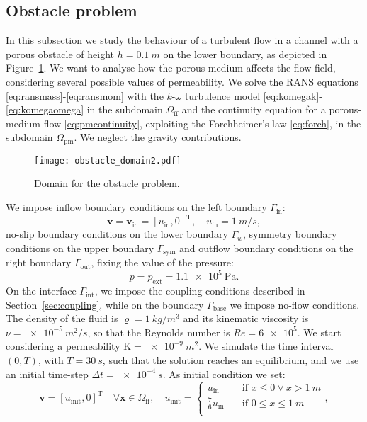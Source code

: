 \subsection{Obstacle problem}
In this subsection we study the behaviour of
a turbulent flow in a channel with a porous obstacle of height $h=\SI{0.1}{m}$ on the lower boundary, as depicted in Figure~\ref{fig:obstacle_domain}. We want to analyse how the porous-medium affects the flow field, considering several possible values of permeability.
We solve the RANS equations \eqref{eq:ransmass}-\eqref{eq:ransmom} with the $k\text{-}\omega$ turbulence model \eqref{eq:komegak}-\eqref{eq:komegaomega} in the subdomain $\Omega_\text{ff}$ and the continuity equation for a porous-medium flow \eqref{eq:pmcontinuity}, exploiting the Forchheimer's law \eqref{eq:forch}, in the subdomain $\Omega_\text{pm}$. We neglect the gravity contributions.
\begin{figure}
	\centering
	\texttt{[image: obstacle\_domain2.pdf]}
	\caption[Domain for the obstacle problem]{Domain for the obstacle problem.}
	\label{fig:obstacle_domain}
\end{figure}
We impose inflow boundary conditions on the left boundary $\Gamma_\text{in}$:
\begin{equation}
\mathbf{v} = \mathbf{v}_\text{in} = [u_\text{in}, 0]^\mathrm{T}, \quad u_\text{in} = \SI{1}{m/s},
\end{equation}
no-slip boundary conditions on the lower boundary $\Gamma_w$, symmetry boundary conditions on the upper boundary $\Gamma_\text{sym}$ and outflow boundary conditions on the right boundary $\Gamma_\text{out}$, fixing the value of the pressure:
\begin{equation}
	p = p_\text{ext} = \SI{1.1e5}{\pascal}.
\end{equation}
On the interface $\Gamma_\text{int}$, we impose the coupling conditions described in Section~\ref{sec:coupling}, while on the boundary $\Gamma_\text{base}$ we impose no-flow conditions.
The density of the fluid is $\varrho = \SI{1}{kg/m^3}$ and its kinematic viscosity is $\nu=\SI{e-5}{m^2/s}$, so that the Reynolds number is $Re=\num{6e5}$. We start considering a permeability $\mathrm{K}=\SI{e-9}{m^2}.$ We simulate the time interval $(0,T) $, with $T=\SI{30}{s}$, such that the solution reaches an equilibrium, and we use an initial time-step $\Delta t = \SI{e-4}{s}$. As initial condition we set:
\begin{equation}
	\mathbf{v} = [u_\text{init}, 0]^\mathrm{T} \quad \forall \mathbf{x} \in \Omega_\text{ff}, \quad u_\text{init} =
	\begin{cases}
	u_\text{in} \quad&\text{if $x\leq 0 \lor x > \SI{1}{m}$}\\
	\frac{7}{6}u_\text{in} \quad&\text{if $0 \leq x \leq \SI{1}{m}$}\\
	\end{cases},
\end{equation}
